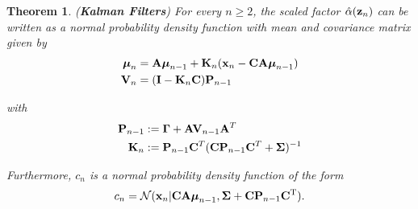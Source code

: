 \documentclass[11pt]{article}
\numberwithin{equation}{section}
\newcommand{\x}{{\bf x}}
\newcommand{\z}{{\bf z}}
\newcommand{\N}{\mathcal{N}}
\newtheorem{theorem}{Theorem}[section]
\begin{document}
\begin{theorem} \label{thorem:alpha-forward-equations-n}
	(\textbf{Kalman Filters}) For every $n \geq 2$, the scaled factor $\hat\alpha(\z_n)$ can be written as a normal probability density function with mean and covariance matrix given by
	\begin{align}
		\boldsymbol{\mu}_n &= {\bf A}\boldsymbol{\mu}_{n-1} + {\bf K}_n(\x_n -{\bf C}{\bf A}\boldsymbol\mu_{n-1})\\
		{\bf V}_n &=  ({\bf I} - {\bf K}_n{\bf C}){\bf P}_{n-1}
	\end{align}
	
	with
	\begin{align}
		{\bf P}_{n-1} &:= \boldsymbol{\Gamma} + {\bf A}{\bf V}_{n-1}{\bf A}^T\\
		{\bf K}_n &:= {\bf P}_{n-1}{\bf C}^T({\bf C} {\bf P}_{n-1}{\bf C}^T + \boldsymbol\Sigma)^{-1}
	\end{align}
	
	Furthermore, $c_n$ is a normal probability density function of the form
	\begin{equation}
		c_n = \N(\x_n \vert {\bf CA}\boldsymbol\mu_{n-1}, \boldsymbol\Sigma + {\bf C P}_{n-1}{\bf C}^\text{T}).
	\end{equation}
\end{theorem}
\end{document}

